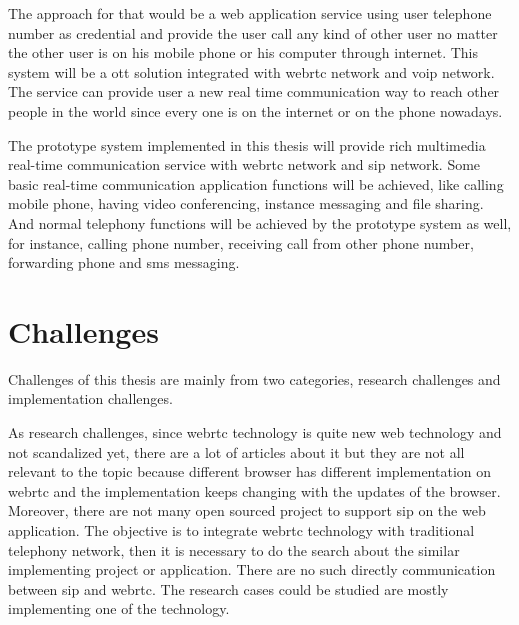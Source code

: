 \par The approach for that would be a web application service using user telephone number as credential and provide the user call any kind of other user no matter the other user is on his mobile phone or his computer through internet. This system will be a \gls{ott} solution integrated with \gls{webrtc} network and \gls{voip} network. The service can provide user a new real time communication way to reach other people in the world since every one is on the internet or on the phone nowadays.

\par The prototype system implemented in this thesis will provide rich multimedia real-time communication service with \gls{webrtc} network and \gls{sip} network. Some basic real-time communication application functions will be achieved, like calling mobile phone, having video conferencing, instance messaging and file sharing. And normal telephony functions will be achieved by the prototype system as well, for instance, calling phone number, receiving call from other phone number, forwarding phone and \gls{sms} messaging.

\section{Challenges}

\noindent Challenges of this thesis are mainly from two categories, research challenges and implementation challenges.

\par As research challenges, since \gls{webrtc} technology is quite new web technology and not scandalized yet, there are a lot of articles about it but they are not all relevant to the topic because different browser has different implementation on \gls{webrtc} and the implementation keeps changing with the updates of the browser. Moreover, there are not many open sourced project to support \gls{sip} on the web application. The objective is to integrate \gls{webrtc} technology with traditional telephony network, then it is necessary to do the search about the similar implementing project or application. There are no such directly communication between \gls{sip} and \gls{webrtc}. The research cases could be studied are mostly implementing one of the technology.

